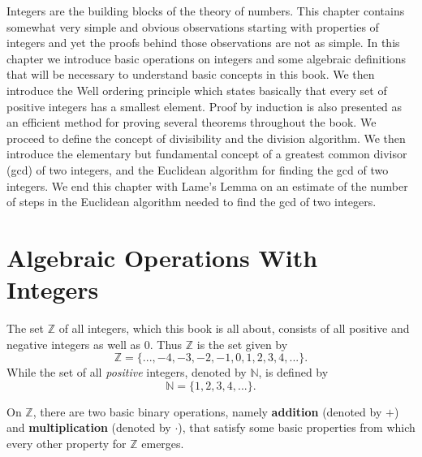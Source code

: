 \documentclass[12pt,letterpaper]{book}
\begin{document}
 Integers are the building blocks of the theory of
numbers. This chapter contains somewhat very simple and obvious
observations starting with properties of integers and yet the proofs
behind those observations are not as simple.  In this chapter we
introduce basic operations on integers and some algebraic
definitions that will be necessary to understand basic concepts in
this book.  We then introduce the Well ordering principle which
states basically that every set of positive integers has a smallest
element.  Proof by induction is also presented as an efficient
method for proving several theorems throughout the book. We proceed
to define the concept of divisibility and the division algorithm. We
then introduce the elementary but fundamental concept of a greatest
common divisor (gcd) of two integers, and the Euclidean algorithm
for finding the gcd of two integers. We end this chapter with Lame's
Lemma on an estimate of the number of steps in the Euclidean
algorithm needed to find the gcd of two integers.

\newpage

\section{Algebraic Operations With Integers}
The set $\mathbb{Z}$ of all integers, which this book is all about,
consists of all positive and negative integers as well as 0. Thus
$\mathbb{Z}$ is the set given by
\begin{equation}
\mathbb{Z}=\{...,-4,-3,-2,-1,0,1,2,3,4,...\}.
\end{equation}
While the set of all {\it positive} integers, denoted by $\mathbb{N}$, is defined by
\begin{equation}
\mathbb{N}=\{1,2,3,4,...\}.
\end{equation}

On $\mathbb{Z}$, there are two basic binary operations, namely {\bf addition}  (denoted by $+$) and {\bf multiplication} (denoted by $\cdot$),
that satisfy some basic properties from which every other property for $\mathbb{Z}$ emerges.\\
\end{document}
